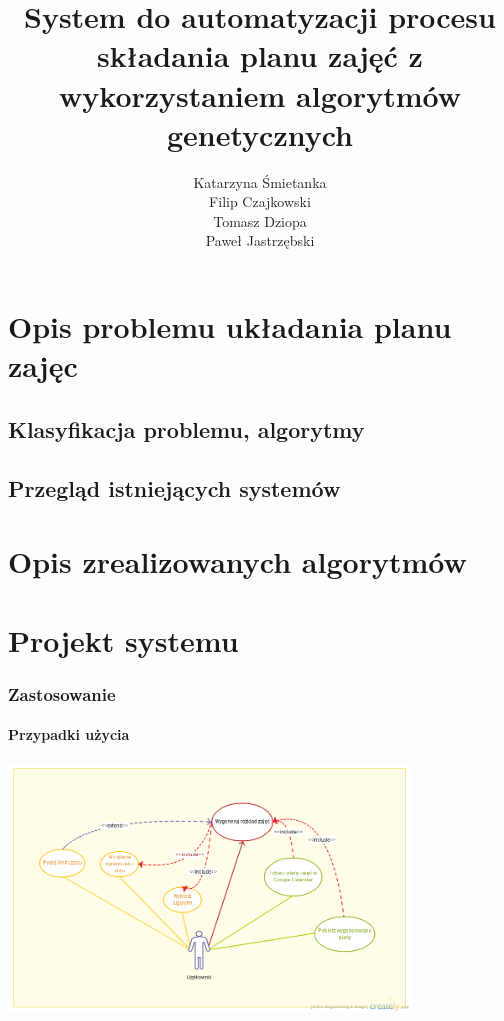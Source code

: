 \documentclass[11pt]{report}
\title{System do automatyzacji procesu składania planu zajęć z wykorzystaniem algorytmów genetycznych}
\author{
	Katarzyna Śmietanka \\
	Filip Czajkowski \\
	Tomasz Dziopa\\
	Paweł Jastrzębski
}
\begin{document}
%
%

\maketitle
\tableofcontents


%


\chapter{Opis problemu układania planu zajęc}
\section{Klasyfikacja problemu, algorytmy}
\section{Przegląd istniejących systemów}




\chapter{Opis zrealizowanych algorytmów}




\chapter{Projekt systemu}
\subsection{Zastosowanie}
\subsubsection{Przypadki użycia}
\par
\includegraphics[width=0.8\textwidth]{InzynierkaUseCase.png}
\end{document}
